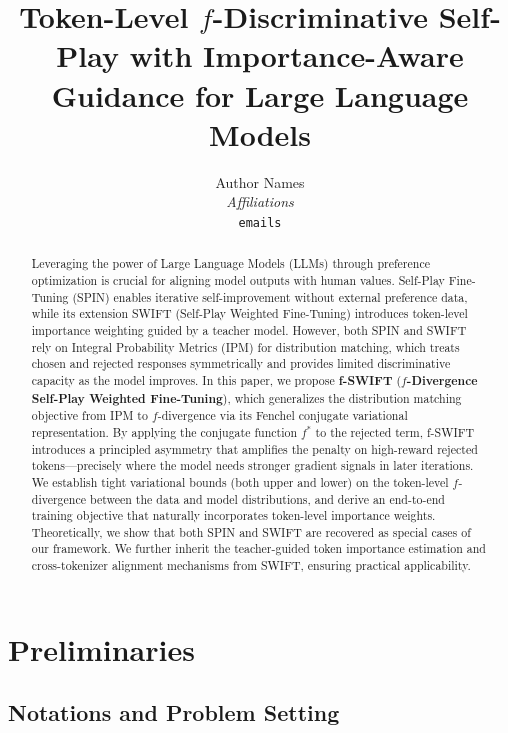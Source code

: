 \documentclass[11pt,a4paper]{article}
\title{\textbf{Token-Level $f$-Discriminative Self-Play with Importance-Aware Guidance for Large Language Models}}
\author{
  Author Names \\
  \textit{Affiliations} \\
  \texttt{emails}
}
\date{}
\begin{document}
\maketitle

\begin{abstract}
Leveraging the power of Large Language Models (LLMs) through preference optimization is crucial for aligning model outputs with human values. Self-Play Fine-Tuning (SPIN) enables iterative self-improvement without external preference data, while its extension SWIFT (Self-Play Weighted Fine-Tuning) introduces token-level importance weighting guided by a teacher model. However, both SPIN and SWIFT rely on Integral Probability Metrics (IPM) for distribution matching, which treats chosen and rejected responses symmetrically and provides limited discriminative capacity as the model improves. In this paper, we propose \textbf{f-SWIFT} (\textbf{$f$-Divergence Self-Play Weighted Fine-Tuning}), which generalizes the distribution matching objective from IPM to $f$-divergence via its Fenchel conjugate variational representation. By applying the conjugate function $f^*$ to the rejected term, f-SWIFT introduces a principled asymmetry that amplifies the penalty on high-reward rejected tokens—precisely where the model needs stronger gradient signals in later iterations. We establish tight variational bounds (both upper and lower) on the token-level $f$-divergence between the data and model distributions, and derive an end-to-end training objective that naturally incorporates token-level importance weights. Theoretically, we show that both SPIN and SWIFT are recovered as special cases of our framework. We further inherit the teacher-guided token importance estimation and cross-tokenizer alignment mechanisms from SWIFT, ensuring practical applicability.
\end{abstract}

\section{Preliminaries}
\label{sec:preliminaries}

\subsection{Notations and Problem Setting}
\label{subsec:notations}
\end{document}
